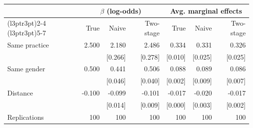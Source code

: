 
\begin{tabular}{lrrrrrr}
\toprule
\multicolumn{1}{c}{ } & \multicolumn{3}{c}{$\beta$ (log-odds)} & \multicolumn{3}{c}{Avg. marginal effects} \\
\cmidrule(l{3pt}r{3pt}){2-4} \cmidrule(l{3pt}r{3pt}){5-7}
 & True & Naive & Two-stage & True & Naive & Two-stage\\
\midrule
Same practice & 2.500 & 2.180 & 2.486 & 0.334 & 0.331 & 0.326\\
 &  & {}[0.266] & {}[0.278] & {}[0.010] & {}[0.025] & {}[0.025]\\
Same gender & 0.500 & 0.441 & 0.506 & 0.088 & 0.089 & 0.086\\
 &  & {}[0.046] & {}[0.040] & {}[0.002] & {}[0.009] & {}[0.007]\\
Distance & -0.100 & -0.099 & -0.101 & -0.017 & -0.020 & -0.017\\
 &  & {}[0.014] & {}[0.009] & {}[0.000] & {}[0.003] & {}[0.002]\\
Replications & 100 & 100 & 100 & 100 & 100 & 100\\
\bottomrule
\end{tabular}
